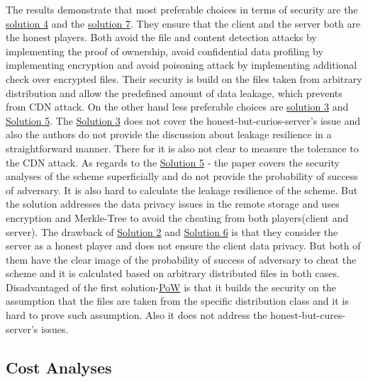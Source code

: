 \documentclass[12pt]{article}
\begin{document}
The results demonstrate that most preferable choices in terms of security are the \hyperref[sub:Soltuion4]{solution 4} and the \hyperref[sub:Soltuion7]{solution 7}. They ensure that the client and the server both are the honest players. Both avoid the file and content detection attacks by implementing the proof of ownership, avoid confidential data profiling by implementing  encryption and avoid poisoning attack by implementing additional check over encrypted files. Their security is build on the files taken from arbitrary distribution and allow the predefined amount of data leakage, which prevents from CDN attack. On the other hand less preferable choices are  \hyperref[sub:Soltuion3]{solution 3} and \hyperref[sub:Soltuion5]{Solution 5}. The \hyperref[sub:Soltuion3]{Solution 3}  does not cover the honest-but-curios-server's issue and also the authors do not provide the discussion about leakage resilience in a straightforward manner. There for it is also not clear to measure the tolerance to the CDN attack. As regards to the \hyperref[sub:Soltuion5]{Solution 5} - the paper covers the security analyses of the scheme  superficially and do not provide the probability of success of adversary. It is also hard to calculate the leakage resilience of the scheme. But the solution  addresses the  data privacy issues in the remote storage and uses encryption and Merkle-Tree to avoid the cheating from both players(client and server). The drawback of \hyperref[sub:Soltuion2]{Solution 2} and \hyperref[sub:Soltuion6]{Solution 6} is that they consider the server as a honest player and does not ensure the client data privacy. But both of them have the clear image of the probability of success of adversary to cheat the scheme and it is calculated based on arbitrary distributed files in both cases. Disadvantaged of the first solution-\hyperref[sub:Soltuion1] {PoW} is that it builds the security on the assumption that the files are taken from the specific distribution class and it is hard to prove such assumption. Also it does not address the honest-but-cures-server's issues.


\subsection{Cost Analyses}
\label{sub:Cost}
\end{document}
